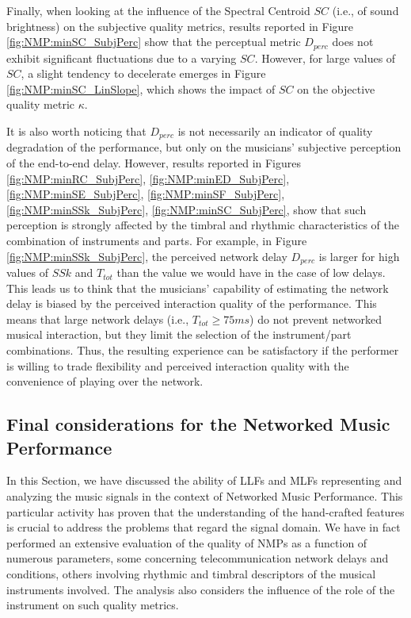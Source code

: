 Finally, when looking at the influence of the Spectral Centroid $SC$ (i.e., of sound brightness) on the subjective quality metrics, results reported in Figure \ref{fig:NMP:minSC_SubjPerc} show that the perceptual metric $D_{perc}$ does not exhibit significant fluctuations due to a varying $SC$. However, for large values of $SC$, a slight tendency to decelerate emerges in Figure \ref{fig:NMP:minSC_LinSlope}, which shows the impact of $SC$ on the objective quality metric $\kappa$.

It is also worth noticing that $D_{perc}$ is not necessarily an indicator of quality degradation of the performance, but only on the musicians' subjective perception of the end-to-end delay. However, results reported in Figures \ref{fig:NMP:minRC_SubjPerc}, \ref{fig:NMP:minED_SubjPerc}, \ref{fig:NMP:minSE_SubjPerc}, \ref{fig:NMP:minSF_SubjPerc}, \ref{fig:NMP:minSSk_SubjPerc}, \ref{fig:NMP:minSC_SubjPerc}, show that such perception is strongly affected by the timbral and rhythmic characteristics of the combination of instruments and parts. For example, in Figure \ref{fig:NMP:minSSk_SubjPerc}, the perceived network delay $D_{perc}$ is larger for high values of $SSk$ and $T_{tot}$ than the value we would have in the case of low delays. This leads us to think that the musicians' capability of estimating the network delay is biased by the perceived interaction quality of the performance.
This means that large network delays (i.e., $T_{tot}\geq 75ms$) do not prevent networked musical interaction, but they limit the selection of the instrument/part combinations. Thus, the resulting experience can be satisfactory if the performer is willing to trade flexibility and perceived interaction quality with the convenience of playing over the network.

\subsection{Final considerations for the Networked Music Performance}\label{sec:NMP:conclusions}
In this Section, we have discussed the ability of LLFs and MLFs representing and analyzing the music signals in the context of Networked Music Performance.
This particular activity has proven that the understanding of the hand-crafted features is crucial to address the problems that regard the signal domain.  We have in fact performed an extensive evaluation of the quality of NMPs as a function of numerous parameters, some concerning telecommunication network delays and conditions, others involving rhythmic and timbral descriptors of the musical instruments involved. The analysis also considers the influence of the role of the instrument on such quality metrics.

